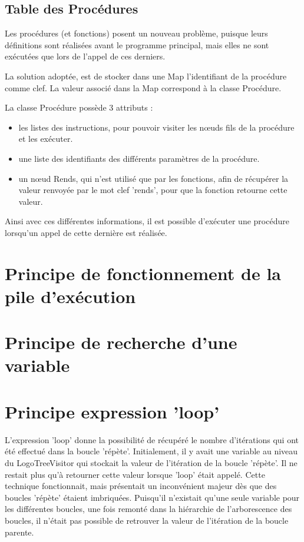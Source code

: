 \documentclass[a4paper,11pt]{article}
\begin{document}
\subsection{Table des Procédures}
Les procédures (et fonctions) posent un nouveau problème, puisque leurs définitions sont réalisées avant le programme principal, mais elles ne sont exécutées que lors de l'appel de ces derniers.

La solution adoptée, est de stocker dans une Map l'identifiant de la procédure comme clef. La valeur associé dans la Map correspond à la classe Procédure.

La classe Procédure possède 3 attributs :
\begin{itemize}
\item les listes des instructions, pour pouvoir visiter les nœuds fils de la procédure et les exécuter.
\item une liste des identifiants des différents paramètres de la procédure.   
\item un nœud Rends, qui n'est utilisé que par les fonctions, afin de récupérer la valeur renvoyée par le mot clef 'rends', pour que la fonction retourne cette valeur.
\end{itemize} 

Ainsi avec ces différentes informations, il est possible d'exécuter une procédure lorsqu'un appel de cette dernière est réalisée.


\section{Principe de fonctionnement de la pile d'exécution}

\section{Principe de recherche d'une variable}

\section{Principe expression 'loop'}
L'expression 'loop' donne la possibilité de récupéré le nombre d'itérations qui ont été effectué dans la boucle 'répète'. Initialement, il y avait une variable au niveau du LogoTreeVisitor qui stockait la valeur de l'itération de la boucle 'répète'. Il ne restait plus qu'à retourner cette valeur lorsque 'loop' était appelé.
Cette technique fonctionnait, mais présentait un inconvénient majeur dès que des boucles 'répète' étaient imbriquées. Puisqu'il n'existait qu'une seule variable pour les différentes boucles, une fois remonté dans la hiérarchie de l'arborescence des boucles, il n'était pas possible de retrouver la valeur de l'itération de la boucle parente. 
\end{document}
